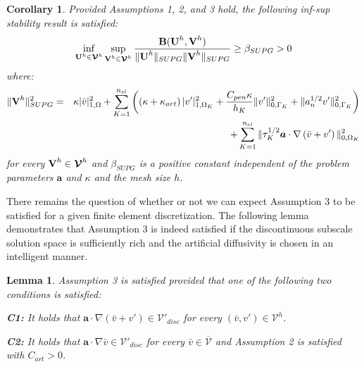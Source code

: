 \documentclass[11pt]{article}
\newtheorem{lemma}[theorem]{Lemma}
\newtheorem{corollary}[theorem]{Corollary}
\begin{document}
\begin{corollary}
Provided Assumptions 1, 2, and 3 hold, the following inf-sup stability result is satisfied:
\begin{equation}
\inf_{\textup{\textbf{U}}^h \in \bm{\mathcal{V}}^h} \sup_{\textup{\textbf{V}}^h \in \bm{\mathcal{V}}^h} \frac{\textup{\textbf{B}}(\textup{\textbf{U}}^h,\textup{\textbf{V}}^h)}{ \| \textup{\textbf{U}}^h \|_{SUPG} \| \textup{\textbf{V}}^h \|_{SUPG} } \geq \beta_{SUPG} > 0 \nonumber
\end{equation}
where:
\begin{eqnarray}
\| \textbf{\textup{V}}^h \|^2_{SUPG} &=& \kappa | \bar{v} |^2_{1,\Omega} + \sum_{K=1}^{n_{el}} \left( \left( \kappa + \kappa_{art} \right) | v' |^2_{1,\Omega_K} + \frac{C_{pen}\kappa}{h_K} \| v' \|^2_{0,\Gamma_K} + \| a_n^{1/2} v' \|^2_{0,\Gamma_K} \right) \nonumber \\ && + \sum_{K=1}^{n_{el}} \| \tau_K^{1/2} \bm{a} \cdot \nabla \left(\bar{v} + v'\right) \|^2_{0,\Omega_K} \nonumber
\end{eqnarray}
for every $\textbf{\textup{V}}^h \in \bm{\mathcal{V}}^h$ and $\beta_{SUPG}$ is a positive constant independent of the problem parameters $\bm{a}$ and $\kappa$ and the mesh size $h$.
\end{corollary}

There remains the question of whether or not we can expect Assumption 3 to be satisfied for a given finite element discretization.  The following lemma demonstrates that Assumption 3 is indeed satisfied if the discontinuous subscale solution space is sufficiently rich and the artificial diffusivity is chosen in an intelligent manner.

\begin{lemma}
Assumption 3 is satisfied provided that one of the following two conditions is satisfied:
\vspace{3pt}

\textbf{\textup{C1:}} It holds that $\bm{a} \cdot \nabla \left(\bar{v} + v' \right) \in \mathcal{V}'_{disc}$ for every $(\bar{v},v') \in \bm{\mathcal{V}}^h$.
\vspace{3pt}

\textbf{\textup{C2:}} It holds that $\bm{a} \cdot \nabla \bar{v} \in \mathcal{V}'_{disc}$ for every $\bar{v} \in \overline{\mathcal{V}}$ and Assumption 2 is satisfied with $C_{art} > 0$.
\end{lemma}
\end{document}
